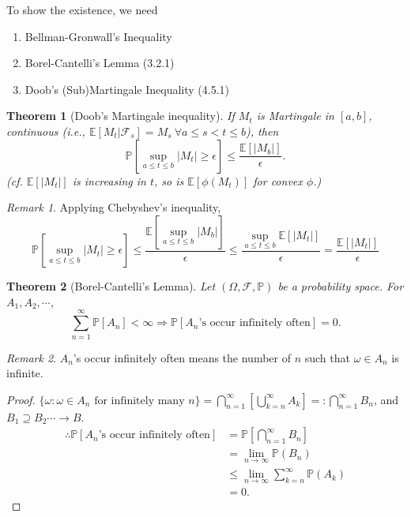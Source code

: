 \documentclass[12pt]{report}
\renewcommand{\P}{\mathbb{P}}
\newcommand{\F}{\mathcal{F}}
\newcommand{\E}{\mathbb{E}}
\renewcommand{\1}{\mathbb{1}}
\renewcommand{\O}{\Omega}
\renewcommand{\supset}{\supseteq}
\theoremstyle{break}
\newtheorem{thm}{Theorem}[section] %
\theoremstyle{newdef}
\theoremstyle{remark}
\newtheorem*{rem}{Remark} %
\begin{document}





To show the existence, we need
\begin{enumerate}
\item Bellman-Gronwall's Inequality
\item Borel-Cantelli's Lemma (3.2.1)
\item Doob's (Sub)Martingale Inequality (4.5.1)
\end{enumerate}




\begin{thm}[Doob's Martingale inequality]
If $M_t$ is Martingale in $[a,b]$, continuous (i.e., $\E[M_t | \F_s] = M_s \ \forall a \leq s < t \leq b$), then
$$
\P\left[\sup_{a\leq t \leq b}\left|M_t\right| \geq \epsilon \right] \leq \frac{\E[|M_b|]}{\epsilon}.
$$
(\textit{cf.} $\E[|M_t|]$ is increasing in $t$, so is $\E[\phi(M_t)]$ for convex $\phi$.)
\end{thm}

\begin{rem}
Applying Chebyshev's inequality,
$$
\P\left[\sup_{a\leq t \leq b}\left|M_t\right| \geq \epsilon \right]
\leq \frac{\E[\sup_{a\leq t \leq b}|M_b|]}{\epsilon}
\leq \frac{\sup_{a\leq t\leq b}\E[|M_t|]}{\epsilon}
= \frac{\E[|M_t|]}{\epsilon}
$$
\end{rem}




\begin{thm}[Borel-Cantelli's Lemma]
Let $(\O,\F,\P)$ be a probability space.
For $A_1, A_2, \cdots$,
$$
\sum_{n=1}^\infty \P[A_n] < \infty \Rightarrow \P[A_n\text{'s occur infinitely often}] = 0.
$$
\end{thm}

\begin{rem}
$A_n$'s occur infinitely often means the number of $n$ such that $\omega \in A_n$ is infinite.
\end{rem}

\begin{proof}
$\{\omega: \omega\in A_n \text{ for infinitely many } n\}
= \bigcap_{n=1}^\infty\left[\bigcup_{k=n}^\infty A_k\right]
=: \bigcap_{n=1}^\infty B_n$, and $B_1 \supset B_2 \cdots \rightarrow B$.
$$
\begin{aligned}
\therefore
\P\left[ A_n\text{'s occur infinitely often}\right]
&= \P[\bigcap_{n=1}^\infty B_n]\\
&= \lim_{n\rightarrow\infty} \P(B_n)\\
&\leq \lim_{n\rightarrow\infty}\sum_{k=n}^\infty \P(A_k)\\
&= 0.
\end{aligned}
$$
\end{proof}
\end{document}
